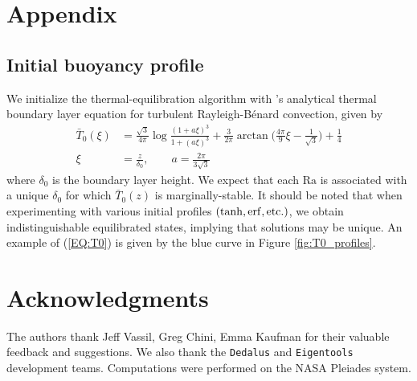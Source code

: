 \documentclass[reprint,amsmath,amssymb,aps]{revtex4-1}
\newcommand\Ra{\mathrm{Ra}}
\begin{document}
\section*{Appendix}
\subsection{Initial buoyancy profile} \label{sec:initial_profile}
We initialize the thermal-equilibration algorithm with \cite{Shishkina}'s analytical thermal boundary layer equation for turbulent Rayleigh-B\'enard convection, given by 
\begin{align}
    \bar{T}_0(\xi) &= \frac{\sqrt{3}}{4\pi} \log \frac{(1 + a\xi)^3}{1 + (a\xi)^3} + \frac{3}{2\pi} \arctan \Big( \frac{4\pi}{9}\xi - \frac{1}{\sqrt{3}} \Big) + \frac{1}{4} \nonumber \\
    \xi &= \frac{z}{\delta_0}, \qquad a = \frac{2\pi}{3\sqrt{3}}\label{EQ:T0}
\end{align}
where $\delta_0$ is the boundary layer height. 
We expect that each $\Ra$ is associated with a unique $\delta_0$ for which $\bar{T}_0(z)$ is marginally-stable. 
It should be noted that when experimenting with various initial profiles $(\tanh, \rm{erf}, \rm{etc.})$, we obtain indistinguishable equilibrated states, implying that solutions may be unique. 
An example of (\ref{EQ:T0}) is given by the blue curve in Figure \ref{fig:T0_profiles}.

\section*{Acknowledgments}
The authors thank Jeff Vassil, Greg Chini, Emma Kaufman for their valuable feedback and suggestions. 
We also thank the \texttt{Dedalus} and \texttt{Eigentools} development teams. 
Computations were performed on the NASA Pleiades system.


% 

\end{document}
